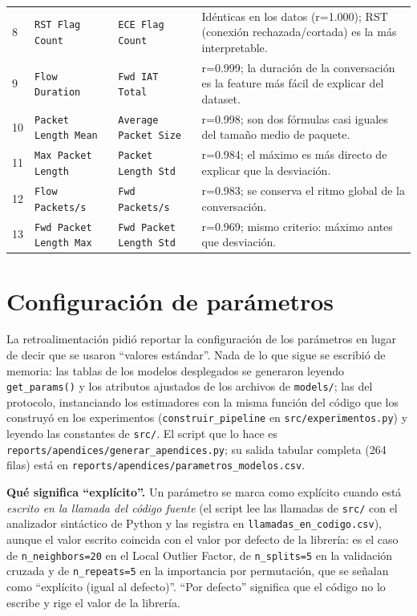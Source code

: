 \documentclass[11pt,a4paper]{article}
\begin{document}
{\begin{longtable}{C{0.6cm} L{3.0cm} L{4.2cm} L{6.3cm}}
8 & \texttt{RST Flag Count} & \texttt{ECE Flag Count} & Idénticas en los datos (r=1.000); RST (conexión rechazada/cortada) es la más interpretable. \\
9 & \texttt{Flow Duration} & \texttt{Fwd IAT Total} & r=0.999; la duración de la conversación es la feature más fácil de explicar del dataset. \\
10 & \texttt{Packet Length Mean} & \texttt{Average Packet Size} & r=0.998; son dos fórmulas casi iguales del tamaño medio de paquete. \\
11 & \texttt{Max Packet Length} & \texttt{Packet Length Std} & r=0.984; el máximo es más directo de explicar que la desviación. \\
12 & \texttt{Flow Packets/s} & \texttt{Fwd Packets/s} & r=0.983; se conserva el ritmo global de la conversación. \\
13 & \texttt{Fwd Packet Length Max} & \texttt{Fwd Packet Length Std} & r=0.969; mismo criterio: máximo antes que desviación. \\
\end{longtable}
}

\section{Configuración de parámetros}
\label{ap:parametros}
\setcounter{table}{0}\setcounter{figure}{0}

La retroalimentación pidió reportar la configuración de los parámetros en
lugar de decir que se usaron ``valores estándar''. Nada de lo que sigue se
escribió de memoria: las tablas de los modelos desplegados se generaron
leyendo \texttt{get\_params()} y los atributos ajustados de los archivos de
\texttt{models/}; las del protocolo, instanciando los estimadores con la misma
función del código que los construyó en los experimentos
(\texttt{construir\_pipeline} en \texttt{src/experimentos.py}) y leyendo las
constantes de \texttt{src/}. El script que lo hace es
\texttt{reports/apendices/generar\_apendices.py}; su salida tabular completa
(264 filas) está en \texttt{reports/apendices/parametros\_modelos.csv}.

\textbf{Qué significa ``explícito''.} Un parámetro se marca como explícito
cuando está \emph{escrito en la llamada del código fuente} (el script lee las
llamadas de \texttt{src/} con el analizador sintáctico de Python y las registra
en \texttt{llamadas\_en\_codigo.csv}), aunque el valor escrito coincida con el
valor por defecto de la librería: es el caso de \texttt{n\_neighbors=20} en el
Local Outlier Factor, de \texttt{n\_splits=5} en la validación cruzada y de
\texttt{n\_repeats=5} en la importancia por permutación, que se señalan como
``explícito (igual al defecto)''. ``Por defecto'' significa que el código no
lo escribe y rige el valor de la librería.
\end{document}
